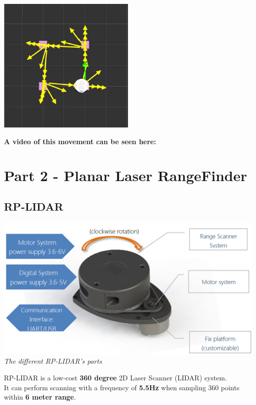 \documentclass[10pt,a4paper]{article}
\begin{document}
\begin{center}
\includegraphics[width=0.5\textwidth]{images/move_base.jpg}\\
\end{center}

\textbf{A video of this movement can be seen here:}\\

\section{Part 2 - Planar Laser RangeFinder}

\subsection{RP-LIDAR}

\begin{center}
\includegraphics[scale=0.4]{images/lidarParts.png}\\
\textit{The different RP-LIDAR's parts}
\end{center}

RP-LIDAR is a low-cost \textbf{360 degree} 2D Laser Scanner (LIDAR) system.\\
It can perform scanning with a frequency of\textbf{ 5.5Hz} when sampling 360 points within \textbf{6 meter range}. \\
\end{document}
